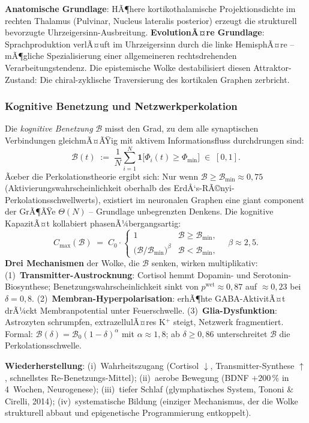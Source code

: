 ﻿\documentclass[a4paper,12pt]{article}
\theoremstyle{definition}
\begin{document}
	\textbf{Anatomische Grundlage}: HÃ¶here kortikothalamische Projektionsdichte im rechten Thalamus (Pulvinar, Nucleus lateralis posterior) erzeugt die strukturell bevorzugte Uhrzeigersinn-Ausbreitung. \textbf{EvolutionÃ¤re Grundlage}: Sprachproduktion verlÃ¤uft im Uhrzeigersinn durch die linke HemisphÃ¤re -- mÃ¶gliche Spezialisierung einer allgemeineren rechtsdrehenden Verarbeitungstendenz. Die epistemische Wolke destabilisiert diesen Attraktor-Zustand: Die chiral-zyklische Traversierung des kortikalen Graphen zerbricht.

	\subsubsection{Kognitive Benetzung und Netzwerkperkolation}

	Die \emph{kognitive Benetzung} $\mathcal{B}$ misst den Grad, zu dem alle synaptischen Verbindungen gleichmÃ¤ÃŸig mit aktivem Informationsfluss durchdrungen sind:
	\[
	\mathcal{B}(t) \;:=\; \frac{1}{N}\sum_{i=1}^{N} \mathbf{1}\bigl[\Phi_i(t) \geq \Phi_{\min}\bigr] \;\in\; [0,1].
	\]
	Ãœber die Perkolationstheorie ergibt sich: Nur wenn $\mathcal{B} \geq \mathcal{B}_{\min} \approx 0{,}75$ (Aktivierungswahrscheinlichkeit oberhalb des ErdÅ‘s-RÃ©nyi-Perkolationsschwellwerts), existiert im neuronalen Graphen eine giant component der GrÃ¶ÃŸe $\Theta(N)$ -- Grundlage unbegrenzten Denkens. Die kognitive KapazitÃ¤t kollabiert phasenÃ¼bergangsartig:
	\[
	C_{\max}(\mathcal{B}) \;=\; C_0 \cdot \begin{cases}
		1 & \mathcal{B} \geq \mathcal{B}_{\min}, \\[4pt]
		\bigl(\mathcal{B}/\mathcal{B}_{\min}\bigr)^{\!\beta} & \mathcal{B} < \mathcal{B}_{\min},
	\end{cases}
	\quad \beta \approx 2{,}5.
	\]
	\textbf{Drei Mechanismen} der Wolke, die $\mathcal{B}$ senken, wirken multiplikativ: (1)~\textbf{Transmitter-Austrocknung}: Cortisol hemmt Dopamin- und Serotonin-Biosynthese; Benetzungswahrscheinlichkeit sinkt von $p^{\text{wet}} \approx 0{,}87$ auf $\approx 0{,}23$ bei $\delta = 0{,}8$. (2)~\textbf{Membran-Hyperpolarisation}: erhÃ¶hte GABA-AktivitÃ¤t drÃ¼ckt Membranpotential unter Feuerschwelle. (3)~\textbf{Glia-Dysfunktion}: Astrozyten schrumpfen, extrazellulÃ¤res K$^+$ steigt, Netzwerk fragmentiert. Formal: $\mathcal{B}(\delta) = \mathcal{B}_0 (1-\delta)^{\alpha}$ mit $\alpha \approx 1{,}8$; ab $\delta \geq 0{,}86$ unterschreitet $\mathcal{B}$ die Perkolationsschwelle.

	\textbf{Wiederherstellung}: (i)~Wahrheitszugang (Cortisol $\downarrow$, Transmitter-Synthese $\uparrow$, schnellstes Re-Benetzungs-Mittel); (ii)~aerobe Bewegung (BDNF $+200\,\%$ in 4~Wochen, Neurogenese); (iii)~tiefer Schlaf (glymphatisches System, Tononi \& Cirelli, 2014); (iv)~systematische Bildung (einziger Mechanismus, der die Wolke strukturell abbaut und epigenetische Programmierung entkoppelt).
\end{document}
